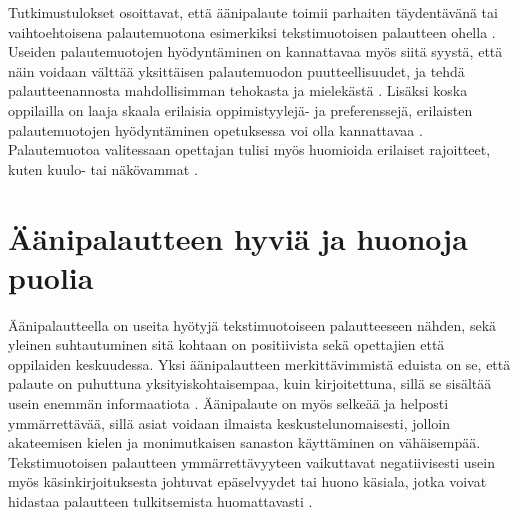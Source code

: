 \documentclass[utf8]{gradu3}
\begin{document}
Tutkimustulokset osoittavat, että äänipalaute toimii parhaiten täydentävänä  tai vaihtoehtoisena palautemuotona esimerkiksi tekstimuotoisen palautteen ohella \parencite[][]{academics, modes, ice}. Useiden palautemuotojen hyödyntäminen on kannattavaa myös siitä syystä, että näin voidaan välttää yksittäisen palautemuodon puutteellisuudet, ja tehdä palautteenannosta mahdollisimman tehokasta ja mielekästä \parencite[][]{modes}. Lisäksi koska oppilailla on laaja skaala erilaisia oppimistyylejä- ja preferenssejä, erilaisten palautemuotojen hyödyntäminen opetuksessa voi olla kannattavaa \parencite[][]{style}. Palautemuotoa valitessaan opettajan tulisi myös huomioida erilaiset rajoitteet, kuten kuulo- tai näkövammat \parencite[][]{evaluating}.

\section{Äänipalautteen hyviä ja huonoja puolia}

Äänipalautteella on useita hyötyjä tekstimuotoiseen palautteeseen nähden, sekä yleinen suhtautuminen sitä kohtaan on positiivista sekä opettajien että oppilaiden keskuudessa. Yksi äänipalautteen merkittävimmistä eduista on se, että palaute on puhuttuna yksityiskohtaisempaa, kuin kirjoitettuna, sillä se sisältää usein enemmän informaatiota \parencite[][]{attitudes}. Äänipalaute on myös selkeää ja helposti ymmärrettävää, sillä asiat voidaan ilmaista keskustelunomaisesti, jolloin akateemisen kielen ja monimutkaisen sanaston käyttäminen on vähäisempää. Tekstimuotoisen palautteen ymmärrettävyyteen vaikuttavat negatiivisesti usein myös käsinkirjoituksesta johtuvat epäselvyydet tai huono käsiala, jotka voivat hidastaa palautteen tulkitsemista huomattavasti \parencite[][]{developing}.
\end{document}
